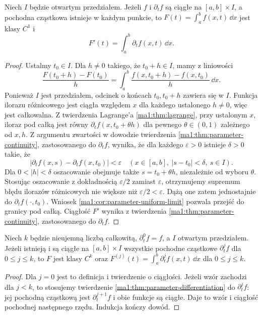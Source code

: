 \begin{twierdzenie}
\label{ma1:thm:parameter-differentiation}
Niech $I$ będzie otwartym przedziałem. Jeżeli $f$ i $\partial_t f$ są ciągłe na $[a,b]\times I$, a pochodna cząstkowa istnieje w każdym punkcie, to $F(t)=\int_a^b f(x,t)\,\dd x$ jest klasy $C^1$ i
\[
 F'(t)=\int_a^b\partial_t f(x,t)\,\dd x.
\]
\end{twierdzenie}
\begin{proof}
Ustalmy $t_0\in I$. Dla $h\ne0$ takiego, że $t_0+h\in I$, mamy z liniowości
\[
 \frac{F(t_0+h)-F(t_0)}h
 =\int_a^b\frac{f(x,t_0+h)-f(x,t_0)}h\,\dd x.
\]
Ponieważ $I$ jest przedziałem, odcinek o końcach $t_0,t_0+h$ zawiera się w $I$. Funkcja ilorazu różnicowego jest ciągła względem $x$ dla każdego ustalonego $h\ne0$, więc jest całkowalna. Z twierdzenia Lagrange'a \ref{ma1:thm:lagrange}, przy ustalonym $x$, iloraz pod całką jest równy $\partial_t f(x,t_0+\theta h)$ dla pewnego $\theta\in(0,1)$ zależnego od $x,h$. Z argumentu zwartości w dowodzie twierdzenia \ref{ma1:thm:parameter-continuity}, zastosowanego do $\partial_t f$, wynika, że dla każdego $\varepsilon>0$ istnieje $\delta>0$ takie, że
\[
 |\partial_t f(x,s)-\partial_t f(x,t_0)|<\varepsilon
 \quad (x\in[a,b],\ |s-t_0|<\delta,\ s\in I).
\]
Dla $0<|h|<\delta$ oszacowanie obejmuje także $s=t_0+\theta h$, niezależnie od wyboru $\theta$. Stosując oszacowanie z dokładnością $\varepsilon/2$ zamiast $\varepsilon$, otrzymujemy supremum błędu ilorazów różnicowych nie większe niż $\varepsilon/2<\varepsilon$. Dążą one zatem jednostajnie do $\partial_t f(\cdot,t_0)$. Wniosek \ref{ma1:cor:parameter-uniform-limit} pozwala przejść do granicy pod całką. Ciągłość $F'$ wynika z twierdzenia \ref{ma1:thm:parameter-continuity}, zastosowanego do $\partial_t f$.
\end{proof}
\begin{wniosek}
\label{ma1:cor:parameter-higher-derivatives}
Niech $k$ będzie nieujemną liczbą całkowitą, $\partial_t^0f=f$, a $I$ otwartym przedziałem. Jeżeli istnieją i są ciągłe na $[a,b]\times I$ wszystkie pochodne cząstkowe $\partial_t^j f$ dla $0\le j\le k$, to $F$ jest klasy $C^k$ oraz
$F^{(j)}(t)=\int_a^b\partial_t^j f(x,t)\,\dd x$ dla $0\le j\le k$.
\end{wniosek}
\begin{proof}
Dla $j=0$ jest to definicja i twierdzenie o ciągłości. Jeżeli wzór zachodzi dla $j<k$, to stosujemy twierdzenie \ref{ma1:thm:parameter-differentiation} do $\partial_t^j f$: jej pochodną cząstkową jest $\partial_t^{j+1}f$ i obie funkcje są ciągłe. Daje to wzór i ciągłość pochodnej następnego rzędu. Indukcja kończy dowód.
\end{proof}
